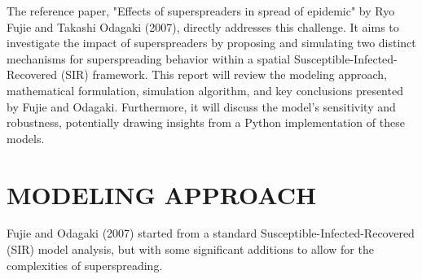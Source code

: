 \documentclass{article}
\begin{document}
The reference paper, "Effects of superspreaders in spread of epidemic" by Ryo Fujie and Takashi Odagaki (2007), directly addresses this challenge. It aims to investigate the impact of superspreaders by proposing and simulating two distinct mechanisms for superspreading behavior within a spatial Susceptible-Infected-Recovered (SIR) framework. This report will review the modeling approach, mathematical formulation, simulation algorithm, and key conclusions presented by Fujie and Odagaki. Furthermore, it will discuss the model's sensitivity and robustness, potentially drawing insights from a Python implementation of these models.

\section{MODELING APPROACH}
\label{sec:modeling_approach}
Fujie and Odagaki (2007) started from a standard Susceptible-Infected-Recovered (SIR) model analysis, but with some significant additions to allow for the complexities of superspreading.
\end{document}
